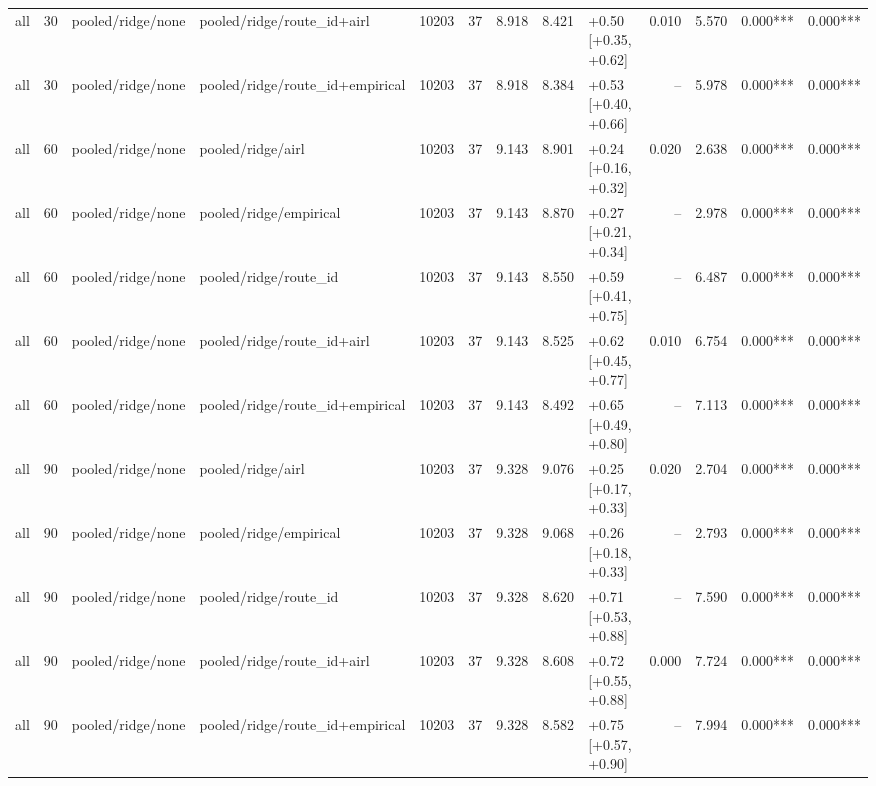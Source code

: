 \begin{tabular}{lrllrrrrlrrll}
all & 30 & pooled/ridge/none & pooled/ridge/route_id+airl & 10203 & 37 & 8.918 & 8.421 & +0.50 [+0.35, +0.62] & 0.010 & 5.570 & 0.000*** & 0.000*** \\
all & 30 & pooled/ridge/none & pooled/ridge/route_id+empirical & 10203 & 37 & 8.918 & 8.384 & +0.53 [+0.40, +0.66] & -- & 5.978 & 0.000*** & 0.000*** \\
all & 60 & pooled/ridge/none & pooled/ridge/airl & 10203 & 37 & 9.143 & 8.901 & +0.24 [+0.16, +0.32] & 0.020 & 2.638 & 0.000*** & 0.000*** \\
all & 60 & pooled/ridge/none & pooled/ridge/empirical & 10203 & 37 & 9.143 & 8.870 & +0.27 [+0.21, +0.34] & -- & 2.978 & 0.000*** & 0.000*** \\
all & 60 & pooled/ridge/none & pooled/ridge/route_id & 10203 & 37 & 9.143 & 8.550 & +0.59 [+0.41, +0.75] & -- & 6.487 & 0.000*** & 0.000*** \\
all & 60 & pooled/ridge/none & pooled/ridge/route_id+airl & 10203 & 37 & 9.143 & 8.525 & +0.62 [+0.45, +0.77] & 0.010 & 6.754 & 0.000*** & 0.000*** \\
all & 60 & pooled/ridge/none & pooled/ridge/route_id+empirical & 10203 & 37 & 9.143 & 8.492 & +0.65 [+0.49, +0.80] & -- & 7.113 & 0.000*** & 0.000*** \\
all & 90 & pooled/ridge/none & pooled/ridge/airl & 10203 & 37 & 9.328 & 9.076 & +0.25 [+0.17, +0.33] & 0.020 & 2.704 & 0.000*** & 0.000*** \\
all & 90 & pooled/ridge/none & pooled/ridge/empirical & 10203 & 37 & 9.328 & 9.068 & +0.26 [+0.18, +0.33] & -- & 2.793 & 0.000*** & 0.000*** \\
all & 90 & pooled/ridge/none & pooled/ridge/route_id & 10203 & 37 & 9.328 & 8.620 & +0.71 [+0.53, +0.88] & -- & 7.590 & 0.000*** & 0.000*** \\
all & 90 & pooled/ridge/none & pooled/ridge/route_id+airl & 10203 & 37 & 9.328 & 8.608 & +0.72 [+0.55, +0.88] & 0.000 & 7.724 & 0.000*** & 0.000*** \\
all & 90 & pooled/ridge/none & pooled/ridge/route_id+empirical & 10203 & 37 & 9.328 & 8.582 & +0.75 [+0.57, +0.90] & -- & 7.994 & 0.000*** & 0.000*** \\
\bottomrule
\end{tabular}
